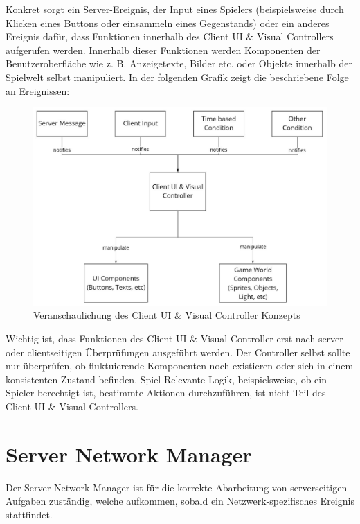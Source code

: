 Konkret sorgt ein Server-Ereignis, der Input eines Spielers (beispielsweise durch Klicken eines Buttons oder einsammeln eines Gegenstands) oder ein anderes Ereignis dafür, dass Funktionen innerhalb des Client UI \& Visual Controllers aufgerufen werden. Innerhalb dieser Funktionen werden Komponenten der Benutzeroberfläche wie z. B. Anzeigetexte, Bilder etc. oder Objekte innerhalb der Spielwelt selbst manipuliert. In der folgenden Grafik zeigt die beschriebene Folge an Ereignissen:

\begin{figure}[H]
	\centering
	\includegraphics[width=150mm]{images/Client_UI_und_Visual_Konzept.jpg}
	\caption[Client UI \& Visual Controller Diagramm]{Veranschaulichung des Client UI \& Visual Controller Konzepts}
	\label{pic:Client_UI_und_Visual_Konzept}
\end{figure}

Wichtig ist, dass Funktionen des Client UI \& Visual Controller erst nach server- oder clientseitigen Überprüfungen ausgeführt werden. Der Controller selbst sollte nur überprüfen, ob fluktuierende Komponenten noch existieren oder sich in einem konsistenten Zustand befinden. Spiel-Relevante Logik, beispielsweise, ob ein Spieler berechtigt ist, bestimmte Aktionen durchzuführen, ist nicht Teil des Client UI \& Visual Controllers.

\section{Server Network Manager}

Der Server Network Manager ist für die korrekte Abarbeitung von serverseitigen Aufgaben zuständig, welche aufkommen, sobald ein Netzwerk-spezifisches Ereignis stattfindet.

